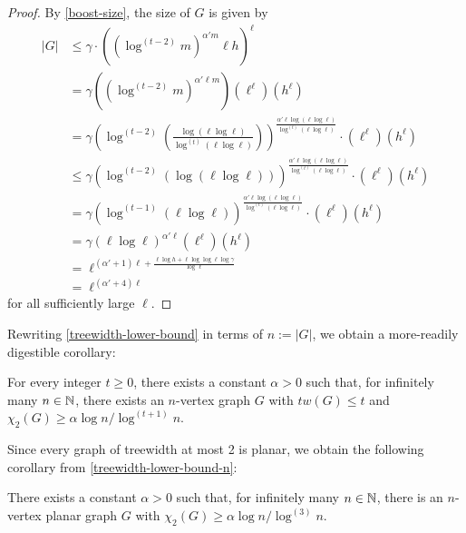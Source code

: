 \documentclass[kpfonts]{patmorin}
\newcommand{\uqs}{\chi_2}
\begin{document}
\begin{proof}
   By \cref{boost-size}, the size of $G$ is given by
   \begin{align*}
        |G| & \le \gamma\cdot \left((\log^{(t-2)}m)^{\alpha' m}\ell h\right)^\ell \\
        & = \gamma ((\log^{(t-2)}m)^{\alpha'\ell m}) (\ell^\ell) (h^\ell) \\
        & = \gamma \left(\log^{(t-2)}\left(\frac{\log(\ell\log\ell)}{\log^{(t)}(\ell\log\ell)}\right)\right)
        ^{\frac{\alpha'\ell\log(\ell\log\ell)}{\log^{(t)}(\ell\log\ell)}} \cdot (\ell^\ell) (h^\ell) \\
        & \le \gamma \left(\log^{(t-2)}(\log(\ell\log\ell))\right)
        ^{\frac{\alpha'\ell\log(\ell\log\ell)}{\log^{(t)}(\ell\log\ell)}} \cdot (\ell^\ell) (h^\ell) \\
        & = \gamma \left(\log^{(t-1)}(\ell\log\ell)\right)
        ^{\frac{\alpha'\ell\log(\ell\log\ell)}{\log^{(t)}(\ell\log\ell)}} \cdot (\ell^\ell) (h^\ell) \\
        & = \gamma (\ell\log\ell)^{\alpha'\ell} (\ell^\ell) (h^\ell) \\
        & = \ell^{(\alpha'+1)\ell + \frac{\ell\log h + \ell\log\log\ell \log\gamma}{\log\ell}} \\
        & = \ell^{(\alpha'+4)\ell}
   \end{align*}
   for all sufficiently large $\ell$.
\end{proof}

Rewriting \cref{treewidth-lower-bound} in terms of $n:=|G|$, we obtain a more-readily digestible corollary:

\begin{cor}\label{treewidth-lower-bound-n}
    For every integer $t\ge 0$, there exists a constant $\alpha>0$ such that, for infinitely many $n\in\mathbb{N}$,   there exists an $n$-vertex graph $G$ with $tw(G)\le t$ and  $\uqs(G)\ge \alpha\log n/\log^{(t+1)} n$.
\end{cor}

Since every graph of treewidth at most 2 is planar, we obtain the following corollary from \cref{treewidth-lower-bound-n}:

\begin{cor}\label{planar-lower-bound}
    There exists a constant $\alpha>0$ such that, for infinitely many $n\in\mathbb{N}$, there is an $n$-vertex planar graph $G$ with $\uqs(G)\ge \alpha\log n/\log^{(3)} n$.
\end{cor}
\end{document}
